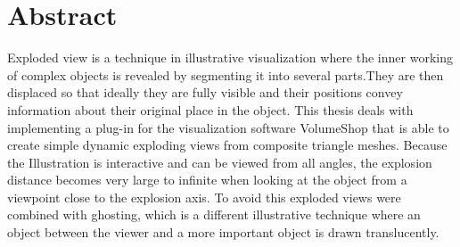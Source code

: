 %
%
%
%
%
%


\chapter*{Abstract}

Exploded view is a technique in illustrative visualization where the inner working of complex objects is revealed by segmenting it into several parts.They are then displaced so that ideally they are fully visible and their positions convey information about their original place in the object. This thesis deals with implementing a plug-in for the visualization software VolumeShop that is able to create simple dynamic exploding views from composite triangle meshes. Because the Illustration is interactive and can be viewed from all angles, the explosion distance becomes very large to infinite when looking at the object from a viewpoint close to the explosion axis.  To avoid this exploded views were combined with ghosting, which is a different illustrative technique where an object between the viewer and a more important object is drawn translucently.